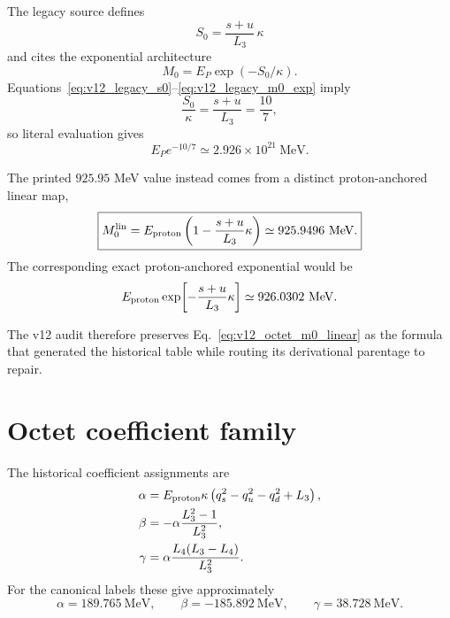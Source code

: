 The legacy source defines
\begin{equation}
S_0=\frac{s+u}{L_3}\,\kappa
\label{eq:v12_legacy_s0}
\end{equation}
and cites the exponential architecture
\begin{equation}
M_0=E_P\exp(-S_0/\kappa).
\label{eq:v12_legacy_m0_exp}
\end{equation}
Equations~\eqref{eq:v12_legacy_s0}--\eqref{eq:v12_legacy_m0_exp} imply
\begin{equation}
\frac{S_0}{\kappa}=\frac{s+u}{L_3}=\frac{10}{7},
\end{equation}
so literal evaluation gives
\begin{equation}
E_Pe^{-10/7}\simeq2.926\times10^{21}\ \mathrm{MeV}.
\end{equation}

The printed $925.95$ MeV value instead comes from a distinct proton-anchored linear map,
\begin{equation}
\boxed{
M_0^{\rm lin}
=E_{\rm proton}
\left(1-\frac{s+u}{L_3}\kappa\right)
\simeq925.9496\ \mathrm{MeV}.
}
\label{eq:v12_octet_m0_linear}
\end{equation}
The corresponding exact proton-anchored exponential would be
\begin{equation}
E_{\rm proton}\exp\!\left[-\frac{s+u}{L_3}\kappa\right]
\simeq926.0302\ \mathrm{MeV}.
\end{equation}

The v12 audit therefore preserves Eq.~\eqref{eq:v12_octet_m0_linear} as the formula that generated the historical table while routing its derivational parentage to repair.

\section{Octet coefficient family}

The historical coefficient assignments are
\begin{align}
\alpha
&=E_{\rm proton}\kappa
\left(q_s^2-q_u^2-q_d^2+L_3\right),
\label{eq:v12_octet_alpha}\\
\beta
&=-\alpha\frac{L_3^2-1}{L_3^2},
\label{eq:v12_octet_beta}\\
\gamma
&=\alpha\frac{L_4(L_3-L_4)}{L_3^2}.
\label{eq:v12_octet_gamma}
\end{align}
For the canonical labels these give approximately
\[
\alpha=189.765\ \mathrm{MeV},\qquad
\beta=-185.892\ \mathrm{MeV},\qquad
\gamma=38.728\ \mathrm{MeV}.
\]

